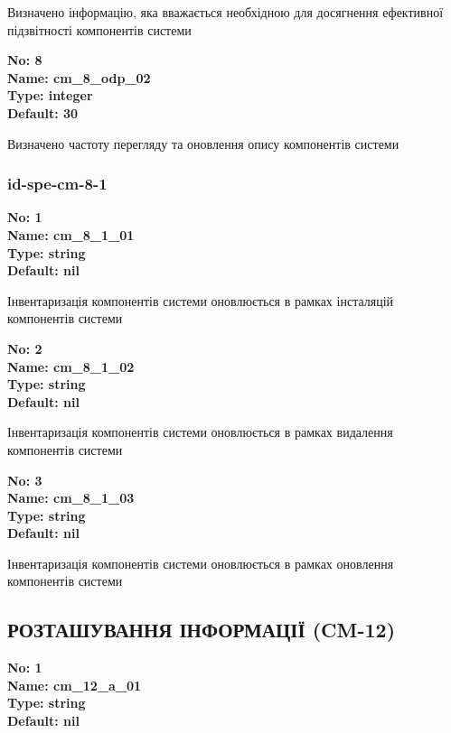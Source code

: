\documentclass{article}
\begin{document}
{\footnotesize Визначено інформацію, яка вважається необхідною для досягнення ефективної підзвітності компонентів системи}


{\footnotesize\bfseries
No: 8\\
Name: cm\_\allowbreak{}8\_\allowbreak{}odp\_\allowbreak{}02\\
Type: integer\\
Default: 30
}

{\footnotesize Визначено частоту перегляду та оновлення опису компонентів системи}




\subsubsection{id-spe-cm-8-1}


\vspace{10pt}
{\footnotesize\bfseries
No: 1\\
Name: cm\_\allowbreak{}8\_\allowbreak{}1\_\allowbreak{}01\\
Type: string\\
Default: nil
}

{\footnotesize Інвентаризація компонентів системи оновлюється в рамках інсталяцій компонентів системи}


{\footnotesize\bfseries
No: 2\\
Name: cm\_\allowbreak{}8\_\allowbreak{}1\_\allowbreak{}02\\
Type: string\\
Default: nil
}

{\footnotesize Інвентаризація компонентів системи оновлюється в рамках видалення компонентів системи}


{\footnotesize\bfseries
No: 3\\
Name: cm\_\allowbreak{}8\_\allowbreak{}1\_\allowbreak{}03\\
Type: string\\
Default: nil
}

{\footnotesize Інвентаризація компонентів системи оновлюється в рамках оновлення компонентів системи}




\subsection{РОЗТАШУВАННЯ ІНФОРМАЦІЇ (CM-12)}


\vspace{10pt}
{\footnotesize\bfseries
No: 1\\
Name: cm\_\allowbreak{}12\_\allowbreak{}a\_\allowbreak{}01\\
Type: string\\
Default: nil
}
\end{document}
